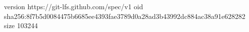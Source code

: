 version https://git-lfs.github.com/spec/v1
oid sha256:8f7b5d0084475b6685ee4393fae3789d0a28ad3b43992dc884ac38a91e628282
size 103244
